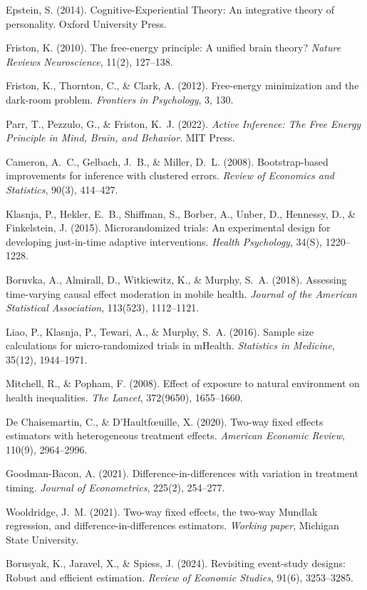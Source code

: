 \documentclass[a4paper,11pt,titlepage]{article}
\begin{document}
\begin{enumerate}[label={[\arabic*]}, leftmargin=2em, itemsep=2pt]
  \item Epstein, S. (2014). Cognitive-Experiential Theory: An integrative theory of personality. Oxford University Press.
  \item Friston, K. (2010). The free-energy principle: A unified brain theory? \textit{Nature Reviews Neuroscience}, 11(2), 127--138.
  \item Friston, K., Thornton, C., \& Clark, A. (2012). Free-energy minimization and the dark-room problem. \textit{Frontiers in Psychology}, 3, 130.
  \item Parr, T., Pezzulo, G., \& Friston, K.~J. (2022). \textit{Active Inference: The Free Energy Principle in Mind, Brain, and Behavior}. MIT Press.
  \item Cameron, A.~C., Gelbach, J.~B., \& Miller, D.~L. (2008). Bootstrap-based improvements for inference with clustered errors. \textit{Review of Economics and Statistics}, 90(3), 414--427.
  \item Klasnja, P., Hekler, E.~B., Shiffman, S., Borber, A., Unber, D., Hennessy, D., \& Finkelstein, J. (2015). Microrandomized trials: An experimental design for developing just-in-time adaptive interventions. \textit{Health Psychology}, 34(S), 1220--1228.
  \item Boruvka, A., Almirall, D., Witkiewitz, K., \& Murphy, S.~A. (2018). Assessing time-varying causal effect moderation in mobile health. \textit{Journal of the American Statistical Association}, 113(523), 1112--1121.
  \item Liao, P., Klasnja, P., Tewari, A., \& Murphy, S.~A. (2016). Sample size calculations for micro-randomized trials in mHealth. \textit{Statistics in Medicine}, 35(12), 1944--1971.
  \item Mitchell, R., \& Popham, F. (2008). Effect of exposure to natural environment on health inequalities. \textit{The Lancet}, 372(9650), 1655--1660.
  \item De Chaisemartin, C., \& D'Haultf{\oe}uille, X. (2020). Two-way fixed effects estimators with heterogeneous treatment effects. \textit{American Economic Review}, 110(9), 2964--2996.
  \item Goodman-Bacon, A. (2021). Difference-in-differences with variation in treatment timing. \textit{Journal of Econometrics}, 225(2), 254--277.
  \item Wooldridge, J.~M. (2021). Two-way fixed effects, the two-way Mundlak regression, and difference-in-differences estimators. \textit{Working paper}, Michigan State University.
  \item Borusyak, K., Jaravel, X., \& Spiess, J. (2024). Revisiting event-study designs: Robust and efficient estimation. \textit{Review of Economic Studies}, 91(6), 3253--3285.

\end{enumerate}
\end{document}
